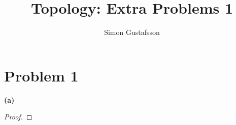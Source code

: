 \documentclass[12pt]{article}
\title{Topology: Extra Problems 1}
\author{Simon Gustafsson}
\date{}
\begin{document}
\maketitle
\section*{Problem 1}
\textbf{(a)}
\begin{proof}
\end{proof}
\end{document}
